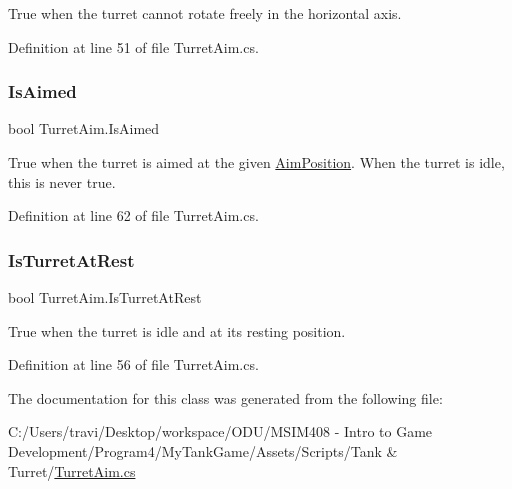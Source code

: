 True when the turret cannot rotate freely in the horizontal axis. 



Definition at line 51 of file Turret\+Aim.\+cs.

\mbox{\label{class_turret_aim_a850d222091cdb64216aa2edc1297a1ba}} 
\subsubsection{\texorpdfstring{Is\+Aimed}{IsAimed}}
{\footnotesize\ttfamily bool Turret\+Aim.\+Is\+Aimed\hspace{0.3cm}{\ttfamily [get]}}



True when the turret is aimed at the given \hyperlink{class_turret_aim_a194f5413aa939b8cbb8a5a9edf2c8660}{Aim\+Position}. When the turret is idle, this is never true. 



Definition at line 62 of file Turret\+Aim.\+cs.

\mbox{\label{class_turret_aim_a1b0a3fd8f069d2364b60591ab3f57e26}} 
\subsubsection{\texorpdfstring{Is\+Turret\+At\+Rest}{IsTurretAtRest}}
{\footnotesize\ttfamily bool Turret\+Aim.\+Is\+Turret\+At\+Rest\hspace{0.3cm}{\ttfamily [get]}}



True when the turret is idle and at its resting position. 



Definition at line 56 of file Turret\+Aim.\+cs.



The documentation for this class was generated from the following file\+:\begin{DoxyCompactItemize}
\item 
C\+:/\+Users/travi/\+Desktop/workspace/\+O\+D\+U/\+M\+S\+I\+M408 -\/ Intro to Game Development/\+Program4/\+My\+Tank\+Game/\+Assets/\+Scripts/\+Tank \& Turret/\hyperlink{_turret_aim_8cs}{Turret\+Aim.\+cs}\end{DoxyCompactItemize}
